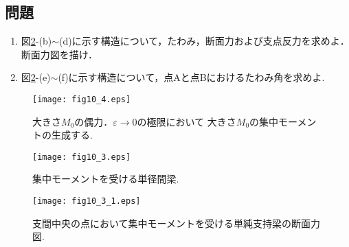 \documentclass[10pt,a4j]{jbook}
\begin{document}
\subsection{問題}
\begin{enumerate}
\item
図\ref{fig:fig10_3}-(b)$\sim$(d)に示す構造について，たわみ，断面力および支点反力を求めよ．
断面力図を描け．
\item
図\ref{fig:fig10_3}-(e)$\sim$(f)に示す構造について，点Aと点Bにおけるたわみ角を求めよ.
\end{enumerate}
\begin{figure}[h]
	\begin{center}
	\texttt{[image: fig10\_4.eps]} 
	\end{center}
	\caption{
		大きさ$M_0$の偶力．$\varepsilon\rightarrow 0$の極限において
		大きさ$M_0$の集中モーメントの生成する.
	} 
	\label{fig:fig10_4}
\end{figure}
\begin{figure}[h]
	\begin{center}
	\texttt{[image: fig10\_3.eps]} 
	\end{center}
	\caption{
		集中モーメントを受ける単径間梁.
	} 
	\label{fig:fig10_3}
\end{figure}
\begin{figure}[h]
	\begin{center}
	\texttt{[image: fig10\_3\_1.eps]} 
	\end{center}
	\caption{
		支間中央の点において集中モーメントを受ける単純支持梁の断面力図.
	} 
	\label{fig:fig10_3_1}
\end{figure}
\end{document}

